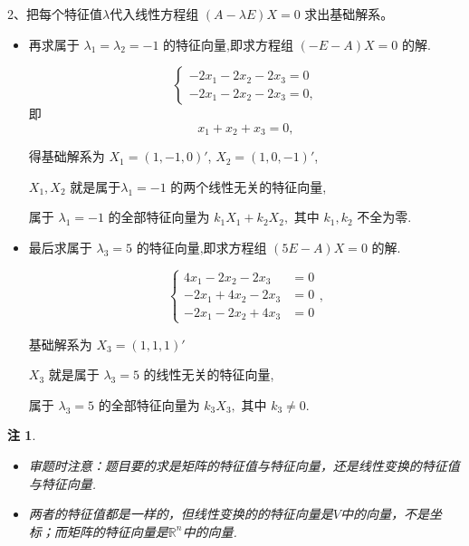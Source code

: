 \documentclass[13pt]{beamer}
\newtheorem*{rem}{注}
\begin{document}
\begin{frame}
2、把每个特征值$\lambda$代入线性方程组 $(A-\lambda E) X=0$
求出基础解系。
\begin{itemize}
\item 再求属于 $\lambda_{1}=\lambda_{2}=-1$ 的特征向量,即求方程组 $(-E-A) X=0$ 的解.

$$\left\{\begin{array}{l}-2 x_{1}-2 x_{2}-2 x_{3}=0 \\ -2 x_{1}-2 x_{2}-2 x_{3}=0,\end{array}\right.$$
即 $$x_{1}+x_{2}+x_{3}=0,$$

得基础解系为 
$X_{1}=(1,-1,0)'$,
$X_{2}=(1,0,-1)'$,

$X_{1}, X_{2}$ 就是属于$\lambda_{1}=-1$ 的两个线性无关的特征向量,

属于 $\lambda_{1}=-1$ 的全部特征向量为 $k_{1} X_{1}+k_{2} X_{2},$ 其中 $k_{1}, k_{2}$ 不全为零. 
\end{itemize}
\end{frame}
\begin{frame}

\begin{itemize}
\item 最后求属于 $\lambda_{3}=5$ 的特征向量,即求方程组 $(5 E-A) X=0$ 的解.

$$\left\{\begin{aligned} 4 x_{1}-2 x_{2}-2 x_{3} &=0 \\-2 x_{1}+4 x_{2}-2 x_{3} &=0
\\-2 x_{1}-2 x_{2}+4 x_{3} &=0 \end{aligned}\right.,$$

基础解系为  $X_{3}=(1,1,1)'$

 $X_{3}$ 就是属于 $\lambda_{3}=5$ 的线性无关的特征向量,

属于 $\lambda_{3}=5$ 的全部特征向量为 $k_{3} X_{3},$ 其中 $k_{3} \neq 0$.
\end{itemize}

\begin{rem}
\begin{itemize}
\item 审题时注意：题目要的求是矩阵的特征值与特征向量，还是线性变换的特征值与特征向量.

\item 两者的特征值都是一样的，但线性变换的的特征向量是$V$中的向量，不是坐标；而矩阵的特征向量是$\mathbb{R}^n$中的向量.
\end{itemize}
\end{rem}
\end{frame}
\end{document}
